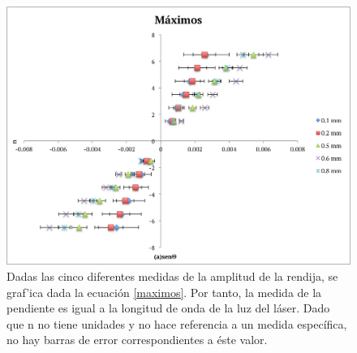 \documentclass[%
 reprint,
 amsmath,amssymb,
 aps,
]{revtex4-1}
\begin{document}
\begin{figure}[H]
    \centering
    \includegraphics[scale= 0.43]{maximos.png}
    \caption{Dadas las cinco diferentes medidas de la amplitud de la rendija, se graf'ica dada la ecuación \eqref{maximos}. Por tanto, la medida de la pendiente es igual a la longitud de onda de la luz del láser. Dado que n no tiene unidades y no hace referencia a un medida específica, no hay barras de error correspondientes a éste valor.}
    \label{fig:maximos}
\end{figure}
\end{document}
